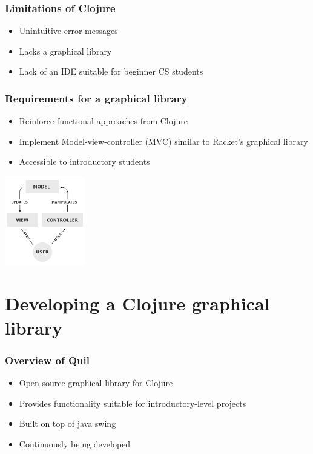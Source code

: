 \documentclass{beamer}
\newcommand{\comment}[1]{{\bf \tt  {#1}}}
\newcommand{\pscomment}[1]{\textcolor{red}{\comment{Paul: {#1}}}}
\begin{document}
\begin{frame}
\frametitle{Limitations of Clojure}
\begin{itemize}
\item Unintuitive error messages
\item Lacks a graphical library
\item Lack of an IDE suitable for beginner CS students
\end{itemize}
\end{frame}

\begin{frame}
\frametitle{Requirements for a graphical library}
\begin{itemize}
\item Reinforce functional approaches from Clojure
\item Implement Model-view-controller (MVC) similar to Racket's graphical library
\item Accessible to introductory students
\end{itemize}
\begin{center}
\includegraphics[width=100pt]{MVC-Process}
\end{center}
\end{frame}

\section{Developing a Clojure graphical library}

\begin{frame}
\frametitle{Overview of Quil}
\begin{itemize}
\item Open source graphical library for Clojure
\item Provides functionality suitable for introductory-level projects
\item Built on top of java swing
\item Continuously being developed
\end{itemize}
\end{frame}
\end{document}
